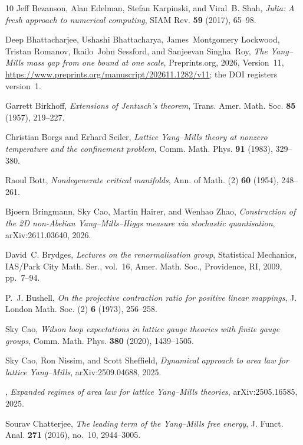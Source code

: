 \documentclass[11pt,a4paper]{amsart}
\theoremstyle{definition}
\theoremstyle{remark}
\numberwithin{equation}{section}
\begin{document}
\begin{thebibliography}{10}
Jeff Bezanson, Alan Edelman, Stefan Karpinski, and Viral~B. Shah, \emph{Julia:
  A fresh approach to numerical computing}, SIAM Rev. \textbf{59} (2017),
  65--98.

Deep Bhattacharjee, Ushashi Bhattacharya, James~Montgomery Lockwood, Tristan
  Romanov, Ikailo~John Sessford, and Sanjeevan Singha~Roy, \emph{The
  {Y}ang--{M}ills mass gap from one bound at one scale}, Preprints.org, 2026,
  Version~11, \url{https://www.preprints.org/manuscript/202611.1282/v11}; the
  DOI registers version~1.

Garrett Birkhoff, \emph{Extensions of {J}entzsch's theorem}, Trans. Amer. Math.
  Soc. \textbf{85} (1957), 219--227.

Christian Borgs and Erhard Seiler, \emph{Lattice {Y}ang--{M}ills theory at
  nonzero temperature and the confinement problem}, Comm. Math. Phys.
  \textbf{91} (1983), 329--380.

Raoul Bott, \emph{Nondegenerate critical manifolds}, Ann. of Math. (2)
  \textbf{60} (1954), 248--261.

Bjoern Bringmann, Sky Cao, Martin Hairer, and Wenhao Zhao, \emph{Construction
  of the {2D} non-{A}belian {Y}ang--{M}ills--{H}iggs measure via stochastic
  quantisation}, arXiv:2611.03640, 2026.

David~C. Brydges, \emph{Lectures on the renormalisation group}, Statistical
  Mechanics, IAS/Park City Math. Ser., vol.~16, Amer. Math. Soc., Providence,
  RI, 2009, pp.~7--94.

P.~J. Bushell, \emph{On the projective contraction ratio for positive linear
  mappings}, J. London Math. Soc. (2) \textbf{6} (1973), 256--258.

Sky Cao, \emph{Wilson loop expectations in lattice gauge theories with finite
  gauge groups}, Comm. Math. Phys. \textbf{380} (2020), 1439--1505.

Sky Cao, Ron Nissim, and Scott Sheffield, \emph{Dynamical approach to area law
  for lattice {Y}ang--{M}ills}, arXiv:2509.04688, 2025.

\bysame, \emph{Expanded regimes of area law for lattice {Y}ang--{M}ills
  theories}, arXiv:2505.16585, 2025.

Sourav Chatterjee, \emph{The leading term of the {Y}ang--{M}ills free energy},
  J. Funct. Anal. \textbf{271} (2016), no.~10, 2944--3005.


\end{thebibliography}
\end{document}
